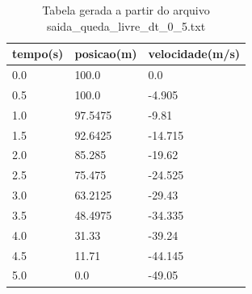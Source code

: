 \begin{table}
\caption{Tabela gerada a partir do arquivo saida\_queda\_livre\_dt\_0\_5.txt}
\label{tab:saida_queda_livre_dt_0_5}
\begin{tabular}{lll}
\toprule
tempo(s) & posicao(m) & velocidade(m/s) \\
\midrule
0.0 & 100.0 & 0.0 \\
0.5 & 100.0 & -4.905 \\
1.0 & 97.5475 & -9.81 \\
1.5 & 92.6425 & -14.715 \\
2.0 & 85.285 & -19.62 \\
2.5 & 75.475 & -24.525 \\
3.0 & 63.2125 & -29.43 \\
3.5 & 48.4975 & -34.335 \\
4.0 & 31.33 & -39.24 \\
4.5 & 11.71 & -44.145 \\
5.0 & 0.0 & -49.05 \\
\bottomrule
\end{tabular}
\end{table}
